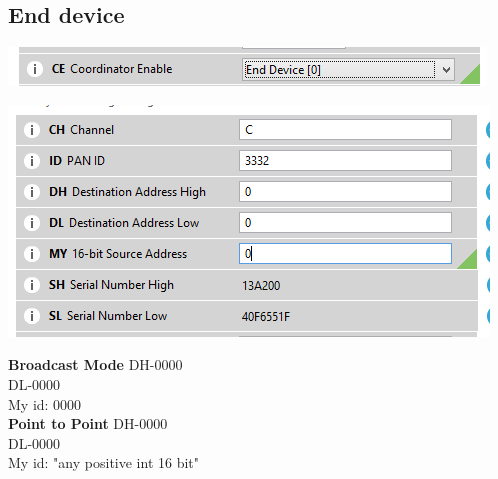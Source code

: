 \documentclass[main.tex]{subfiles}
\begin{document}
\pagebreak
\subsection{End device}
\includegraphics[scale=1]{Images/endenb.png}

\includegraphics[scale=1]{Images/atend.png}

\noindent\textbf{Broadcast Mode}
DH-0000\\ 
DL-0000 \\
My id: 0000\\

\noindent\textbf{Point to Point}
DH-0000\\ 
DL-0000\\
My id: "any positive int 16 bit"
\end{document}
